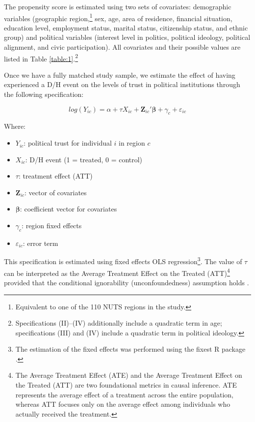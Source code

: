 \documentclass{article}
\begin{document}
The propensity score is estimated using two sets of covariates: demographic variables (geographic region,\footnote{Equivalent to one of the 110 NUTS regions in the study.} sex, age, area of residence, financial situation, education level, employment status, marital status, citizenship status, and ethnic group) and political variables (interest level in politics, political ideology, political alignment, and civic participation). All covariates and their possible values are listed in Table \ref{table:1}.\footnote{Specifications (II)--(IV) additionally include a quadratic term in age; specifications (III) and (IV) include a quadratic term in political ideology.}

Once we have a fully matched study sample, we estimate the effect of having experienced a D/H event on the levels of trust in political institutions through the following specification:

\begin{equation}
\label{eq:1}
log(Y_{ic}) = \alpha + \tau X_{ic} + \mathbf{Z}_{ic}'\mathbf{\beta} + \gamma_c + \varepsilon_{ic}
\end{equation}

Where:
\begin{itemize}
  \item \( Y_{ic} \): political trust for individual \( i \) in region \( c \)
  \item \( X_{ic} \): D/H event (1 = treated, 0 = control)
  \item \( \tau \): treatment effect (ATT)
  \item \( \mathbf{Z}_{ic} \): vector of covariates
  \item \( \mathbf{\beta} \): coefficient vector for covariates
  \item \( \gamma_c \): region fixed effects
  \item \( \varepsilon_{ic} \): error term
\end{itemize}

This specification is estimated using fixed effects OLS regression\footnote{The estimation of the fixed effects was performed using the fixest R package \parencite{berge_efficient_2018}.}. The value of \( \tau \) can be interpreted as the Average Treatment Effect on the Treated (ATT)\footnote{The Average Treatment Effect (ATE) and the Average Treatment Effect on the Treated (ATT) are two foundational metrics in causal inference. ATE represents the average effect of a treatment across the entire population, whereas ATT focuses only on the average effect among individuals who actually received the treatment.} provided that the conditional ignorability (unconfoundedness) assumption holds \parencite{abadie_econometric_2018, greifer_matching_2021}.
\end{document}
